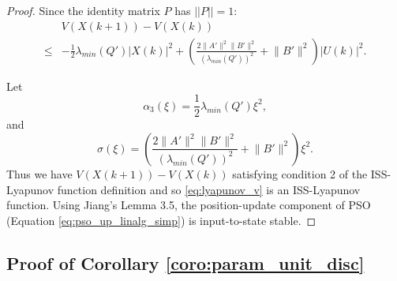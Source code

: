 \documentclass{sig-alternate}
\begin{document}
\begin{proof}
Since the identity matrix $ P $ has $ || P || = 1 $:
\begin{equation}
\label{eq:lyapunov_delta5}
\begin{aligned}
& V( X(k+1) ) - V( X(k) ) \\
	\leq & - \frac{1}{2} \lambda_{min}(Q') | X(k) |^{2} + \left( \frac{2 \lVert A' \rVert^{2} \lVert B' \rVert^{2}}{ ( \lambda_{min}(Q') )^{2} } + \lVert B' \rVert^{2} \right) | U(k) |^{2}.
\end{aligned}
\end{equation}
		
Let
\begin{equation}
\nonumber
\alpha_{3} ( \xi )= \frac{1}{2} \lambda_{min}(Q') \xi^{2} ,
\end{equation}
and
\begin{equation}
\nonumber
\sigma ( \xi ) = \left( \frac{2 \lVert A' \rVert^{2} \lVert B' \rVert^{2}}{ ( \lambda_{min}(Q') )^{2} } +  \lVert B' \rVert^{2} \right) \xi^{2} .
\end{equation} 
Thus we have $  V( X(k+1) ) - V( X(k) ) $ satisfying condition 2 of the ISS-Lyapunov function definition and
so \eqref{eq:lyapunov_v} is an ISS-Lyapunov function.
Using Jiang's Lemma 3.5\cite{Jiang2001857}, the position-update component of PSO (Equation \eqref{eq:pso_up_linalg_simp}) is input-to-state stable.
\end{proof}

\subsection{Proof of Corollary \ref{coro:param_unit_disc}}
\label{sec:coro:param_unit_disc:proof}
\end{document}
